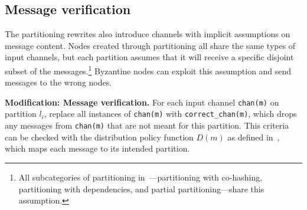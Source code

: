 



\subsection{Message verification}
\label{sec:message-verification}

The partitioning rewrites also introduce channels with implicit assumptions on message content.
Nodes created through partitioning all share the same types of input channels, but each partition assumes that it will receive a specific disjoint subset of the messages.\footnote{All subcategories of partitioning in~\cite{autocomp}---partitioning with co-hashing, partitioning with dependencies, and partial partitioning---share this assumption.}
Byzantine nodes can exploit this assumption and send messages to the wrong nodes.

\textbf{Modification: Message verification.}
For each input channel \texttt{chan(m)} on partition $l_i$, replace all instances of \texttt{chan(m)} with \texttt{correct\_chan(m)}, which drops any messages from \texttt{chan(m)} that are not meant for this partition.
This criteria can be checked with the distribution policy function $D(m)$ as defined in~\cite{autocomp}, which maps each message to its intended partition.


